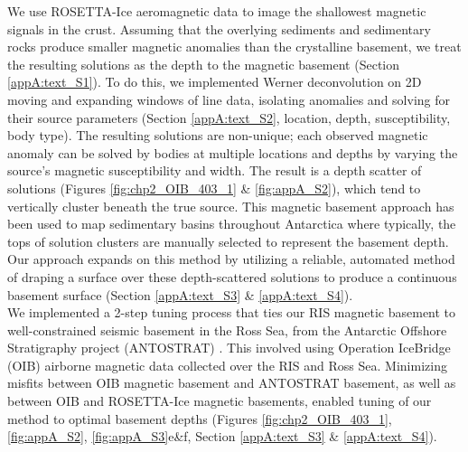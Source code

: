 We use ROSETTA-Ice aeromagnetic data to image the shallowest magnetic signals in the crust. Assuming that the overlying sediments and sedimentary rocks produce smaller magnetic anomalies than the crystalline basement, we treat the resulting solutions as the depth to the magnetic basement (Section \ref{appA:text_S1}). To do this, we implemented Werner deconvolution \citep{wernerinterpretation1953} on 2D moving and expanding windows of line data, isolating anomalies and solving for their source parameters (Section \ref{appA:text_S2}, location, depth, susceptibility, body type). The resulting solutions are non-unique; each observed magnetic anomaly can be solved by bodies at multiple locations and depths by varying the source's magnetic susceptibility and width. The result is a depth scatter of solutions (Figures \ref{fig:chp2_OIB_403_1} \& \ref{fig:appA_S2}), which tend to vertically cluster beneath the true source. This magnetic basement approach has been used to map sedimentary basins throughout Antarctica \citep[i.e.][]{karnergravity2005, bellidentifying2006, studingersubice2004, frederickdistribution2016} where typically, the tops of solution clusters are manually selected to represent the basement depth. Our approach expands on this method by utilizing a reliable, automated method of draping a surface over these depth-scattered solutions to produce a continuous basement surface (Section \ref{appA:text_S3} \& \ref{appA:text_S4}).\\

We implemented a 2-step tuning process that ties our RIS magnetic basement to well-constrained seismic basement in the Ross Sea, from the Antarctic Offshore Stratigraphy project (ANTOSTRAT) \citep[Figure \ref{fig:chp2_Bathy_Mag}b,][]{brancolinidescriptive1995}. This involved using Operation IceBridge (OIB) airborne magnetic data \citep{cochranicebridge2014} collected over the RIS and Ross Sea. Minimizing misfits between OIB magnetic basement and ANTOSTRAT basement, as well as between OIB and ROSETTA-Ice magnetic basements, enabled tuning of our method to optimal basement depths (Figures \ref{fig:chp2_OIB_403_1}, \ref{fig:appA_S2}, \ref{fig:appA_S3}e\&f, Section \ref{appA:text_S3} \& \ref{appA:text_S4}).\\

